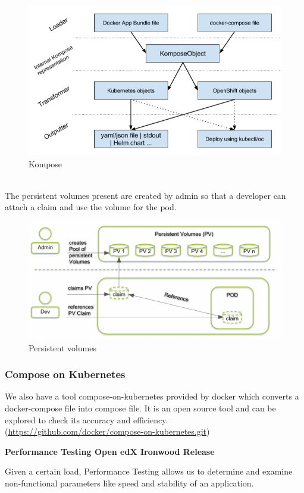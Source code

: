 \documentclass[12pt]{article}
\begin{document}
\begin{figure}[h!]
	\begin{center}
		\includegraphics[totalheight=0.38\textheight]{kompose}
		\caption{Kompose}
	\end{center}
\end{figure}
\\The persistent volumes present are created by admin so that a developer can attach a claim and use the volume for the pod.
\begin{figure}[h!]
	\begin{center}
		\includegraphics[totalheight=0.33\textheight]{persistentvolumes}
		\caption{Persistent volumes}
	\end{center}
\end{figure}
\subsubsection{Compose on Kubernetes}
We also have a tool compose-on-kubernetes provided by docker which converts a docker-compose file into compose file. It is an open source tool and can be explored to check its accuracy and efficiency.(\href{https://github.com/docker/compose-on-kubernetes.git}{https://github.com/docker/compose-on-kubernetes.git})
\pagebreak
\begin{center}
	\textbf{\Large{Performance Testing Open edX Ironwood Release}}
\end{center}
Given a certain load, Performance Testing allows us to determine and examine non-functional parameters like speed and stability of an application.
\par
\end{document}
